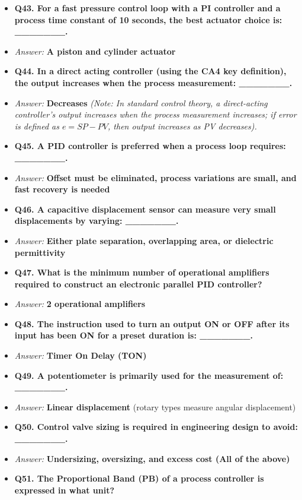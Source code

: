 \begin{itemize}
  \item \textbf{Q43. For a fast pressure control loop with a PI controller and a process time constant of 10 seconds, the best actuator choice is: \_\_\_\_\_\_\_.}
  \item \textit{Answer:} \textbf{A piston and cylinder actuator}
  \item \textbf{Q44. In a direct acting controller (using the CA4 key definition), the output increases when the process measurement: \_\_\_\_\_\_\_.}
  \item \textit{Answer:} \textbf{Decreases} \textit{(Note: In standard control theory, a direct-acting controller's output increases when the process measurement increases; if error is defined as $e=SP-PV$, then output increases as PV decreases).}
  \item \textbf{Q45. A PID controller is preferred when a process loop requires: \_\_\_\_\_\_\_.}
  \item \textit{Answer:} \textbf{Offset must be eliminated, process variations are small, and fast recovery is needed}
  \item \textbf{Q46. A capacitive displacement sensor can measure very small displacements by varying: \_\_\_\_\_\_\_.}
  \item \textit{Answer:} \textbf{Either plate separation, overlapping area, or dielectric permittivity}
  \item \textbf{Q47. What is the minimum number of operational amplifiers required to construct an electronic parallel PID controller?}
  \item \textit{Answer:} \textbf{2 operational amplifiers}
  \item \textbf{Q48. The instruction used to turn an output ON or OFF after its input has been ON for a preset duration is: \_\_\_\_\_\_\_.}
  \item \textit{Answer:} \textbf{Timer On Delay (TON)}
  \item \textbf{Q49. A potentiometer is primarily used for the measurement of: \_\_\_\_\_\_\_.}
  \item \textit{Answer:} \textbf{Linear displacement} (rotary types measure angular displacement)
  \item \textbf{Q50. Control valve sizing is required in engineering design to avoid: \_\_\_\_\_\_\_.}
  \item \textit{Answer:} \textbf{Undersizing, oversizing, and excess cost (All of the above)}
  \item \textbf{Q51. The Proportional Band (PB) of a process controller is expressed in what unit?}

\end{itemize}
